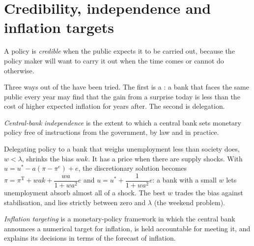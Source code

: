 \section{Credibility, independence and inflation targets}\label{sec:b2:expectations-and-lucas-critique:credibility}

\begin{definition}[Credibility]\label{def:b2:expectations-and-lucas-critique:credibility}
A policy is \emph{credible} when the public expects it to be carried out, because the
policy maker will want to carry it out when the time comes or cannot do otherwise.
\end{definition}

Three ways out of the  have been tried. The first is a : a bank that faces the same public every
year may find that the gain from a surprise today is less than the cost of higher expected inflation for years after. The
second is delegation.

\begin{definition}\label{def:b2:expectations-and-lucas-critique:cbi}
\emph{Central-bank independence} is the extent to which a central bank sets monetary
policy free of instructions from the government, by law and in practice.
\end{definition}

Delegating policy to a bank that weighs unemployment less than society does, $w < \lambda$, shrinks the bias $wak$. It has a price when there
are supply shocks. With $u = u^* - a(\pi - \pi^e) + e$, the discretionary solution becomes $\pi = \pi^{\mathrm T} + wak + \dfrac{wa}{1 + wa^2}e$ and $u = u^* + \dfrac{1}{1 + wa^2}e$: a bank with a small $w$ lets unemployment absorb almost
all of a shock. The best $w$ trades the bias against stabilisation, and lies strictly between zero and $\lambda$ (the weekend problem).

\begin{definition}\label{def:b2:expectations-and-lucas-critique:inflation-targeting}
\emph{Inflation targeting} is a monetary-policy framework in which the central bank announces
a numerical target for inflation, is held accountable for meeting it, and explains its decisions in terms of the
forecast of inflation.
\end{definition}

